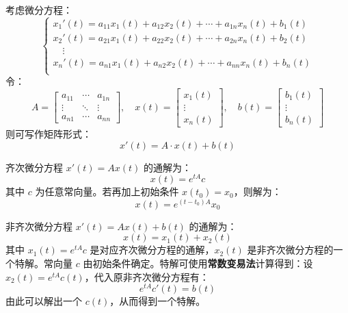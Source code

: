 \begin{example}[在微分方程中的应用]
考虑微分方程：
\[
    \begin{cases}
    x_1'(t)=a_{11}x_1(t)+a_{12}x_2(t)+\cdots+a_{1n}x_n(t)+b_1(t)\\
    x_2'(t)=a_{21}x_1(t)+a_{22}x_2(t)+\cdots+a_{2n}x_n(t)+b_2(t)\\
    \quad\vdots\\
    x_n'(t)=a_{n1}x_1(t)+a_{n2}x_2(t)+\cdots+a_{nn}x_n(t)+b_n(t)\\
    \end{cases}
\]
令：
\[
    A=\begin{bmatrix}a_{11}&\cdots&a_{1n}\\\vdots&\ddots&\vdots\\a_{n1}&\cdots&a_{nn}\end{bmatrix},\quad
x(t)=\begin{bmatrix}x_1(t)\\\vdots\\x_n(t)\end{bmatrix},\quad
b(t)=\begin{bmatrix}b_1(t)\\\vdots\\b_n(t)\end{bmatrix}
\]
则可写作矩阵形式：
\[
    x'(t)=A\cdot x(t)+b(t)
\]
\end{example}

\begin{theorem}
齐次微分方程 $x'(t)=Ax(t)$ 的通解为：
\[
    x(t)=e^{tA}c
\]
其中 $c$ 为任意常向量。若再加上初始条件 $x(t_0)=x_0$，则解为：
\[
    x(t)=e^{(t-t_0)A}x_0
\]
\end{theorem}

\begin{theorem}
非齐次微分方程 $x'(t)=Ax(t)+b(t)$ 的通解为：
\[
    x(t)=x_1(t)+x_2(t)
\]
其中 $x_1(t)=e^{tA}c$ 是对应齐次微分方程的通解，$x_2(t)$ 是非齐次微分方程的一个特解。常向量 $c$ 由初始条件确定。特解可使用\textbf{常数变易法}计算得到：设 $x_2(t)=e^{tA}c(t)$，代入原非齐次微分方程有：
\[
    e^{tA}c'(t)=b(t)
\]
由此可以解出一个 $c(t)$，从而得到一个特解。
\end{theorem}
